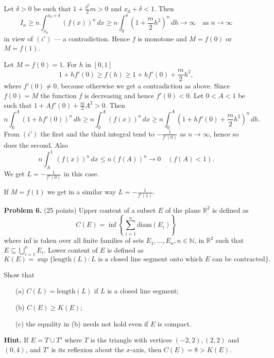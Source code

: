 \documentclass{article}
\begin{document}
\begin{itemize}
    Let \( \delta > 0 \) be such that \( 1 + \frac{\delta^2}{2} m > 0 \) and \( x_0 + \delta < 1 \).
    Then
    \[
    I_n \geq n \int_{x_0}^{x_0+\delta} (f(x))^n \, dx \geq n \int_{0}^{\delta} \left( 1 + \frac{m}{2} h^2 \right)^n \, dh \rightarrow \infty \quad \text{as } n \to \infty
    \]
    in view of \( (i') \) — a contradiction. Hence \( f \) is monotone and \( M = f(0) \) or \( M = f(1) \).

    Let \( M = f(0) = 1 \). For \( h \) in \([0,1]\)
    \[
    1 + h f'(0) \geq f(h) \geq 1 + h f'(0) + \frac{m}{2} h^2,
    \]
    where \( f'(0) \neq 0 \), because otherwise we get a contradiction as above.
    Since \( f(0) = M \) the function \( f \) is decreasing and hence \( f'(0) < 0 \).
    Let \( 0 < A < 1 \) be such that \( 1 + A f'(0) + \frac{m}{2} A^2 > 0 \).
    Then
    \[
    n \int_{0}^{A} (1 + h f'(0))^n \, dh \geq n \int_{0}^{A} (f(x))^n \, dx \geq n \int_{0}^{A} \left(1 + h f'(0) + \frac{m}{2} h^2 \right)^n \, dh.
    \]
    From \( (i') \) the first and the third integral tend to \( -\frac{1}{f'(0)} \) as \( n \to \infty \), hence so does the second.
    Also
    \[
    n \int_{A}^{1} (f(x))^n \, dx \leq n (f(A))^n \rightarrow 0 \quad (f(A) < 1).
    \]
    We get \( L = -\frac{1}{f'(0)} \) in this case.

    If \( M = f(1) \) we get in a similar way \( L = -\frac{1}{f'(1)} \).
\end{itemize}

\textbf{Problem 6.} (25 points)
    Upper content of a subset \( E \) of the plane \( \mathbb{R}^2 \) is defined as
    \[
    C(E) = \inf\left\{ \sum_{i=1}^{n} \text{diam}(E_i) \right\}
    \]
    where inf is taken over all finite families of sets \( E_1, \ldots, E_n, n \in \mathbb{N} \), in \( \mathbb{R}^2 \) such that \( E \subseteq \bigcup_{i=1}^{n} E_i \).
Lower content of \( E \) is defined as
\[
K(E) = \sup\{\text{length}(L) : L \text{ is a closed line segment onto which } E \text{ can be contracted}\}.
\]

Show that
\begin{itemize}
    \item[(a)] \( C(L) = \text{length}(L) \) if \( L \) is a closed line segment;
    \item[(b)] \( C(E) \geq K(E) \);
    \item[(c)] the equality in (b) needs not hold even if \( E \) is compact.
\end{itemize}
\textbf{Hint.} If \( E = T \cup T' \) where \( T \) is the triangle with vertices \( (-2, 2), (2, 2) \) and \( (0, 4) \), and \( T' \) is its reflexion about the \( x \)-axis, then \( C(E) = 8 > K(E) \).
\end{document}
